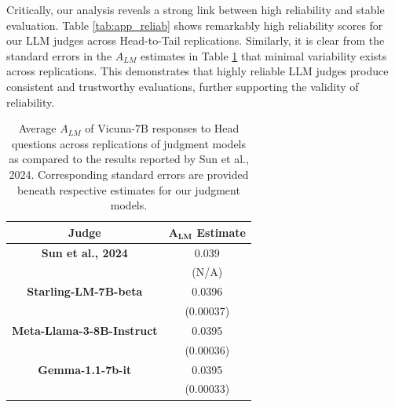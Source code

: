 \documentclass[11pt]{article}
\begin{document}
Critically, our analysis reveals a strong link between high reliability and stable evaluation. Table \ref{tab:app_reliab} shows remarkably high reliability scores for our LLM judges across Head-to-Tail replications. Similarly, it is clear from the standard errors in the $A_{LM}$ estimates in Table \ref{tab:acc_alm} that minimal variability exists across replications. This demonstrates that highly reliable LLM judges produce consistent and trustworthy evaluations, further supporting the validity of reliability. 



\begin{table}
    \centering
    \begin{tabular}{cc}
        \textbf{Judge} & $\mathbf{A_{LM}}$ \textbf{Estimate} \\
        \hline
        \textbf{Sun et al., 2024} & 0.039\\
        & (N/A)\\
         \textbf{Starling-LM-7B-beta} & 0.0396 \\%
         & (0.00037)\\
         \textbf{Meta-Llama-3-8B-Instruct} & 0.0395 \\%
         & (0.00036)\\
         \textbf{Gemma-1.1-7b-it} & 0.0395 \\%
         & (0.00033)\\
         \hline
    \end{tabular}
    \caption{Average $A_{LM}$ of Vicuna-7B responses to Head questions across replications of judgment models as compared to the results reported by Sun et al., 2024. Corresponding standard errors are provided beneath respective estimates for our judgment models.}
    \label{tab:acc_alm}
\end{table}
\end{document}
